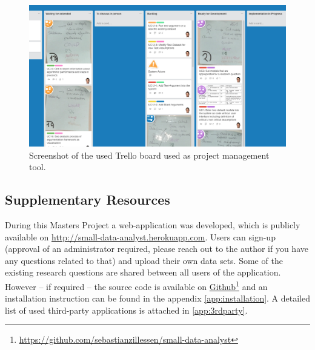 \begin{figure}[h]
\centering
	\includegraphics[page=1,width=\textwidth]{figures/trello}
\caption{Screenshot of the used Trello board used as project management tool.}
\label{fig:trello}
\end{figure}

\subsection{Supplementary Resources}

During this Masters Project a web-application was developed, which is publicly available on \href{http://small-data-analyst.herokuapp.com}{http://small-data-analyst.herokuapp.com}. Users can sign-up (approval of an administrator required, please reach out to the author if you have any questions related to that) and upload their own data sets. Some of the existing research questions are shared between all users of the application. However -- if required -- the source code is available on \href{https://github.com/sebastianzillessen/small-data-analyst}{Github}\footnote{\url{https://github.com/sebastianzillessen/small-data-analyst}} and an installation instruction can be found in the appendix \autoref{app:installation}. A detailed list of used third-party applications is attached in \autoref{app:3rdparty}.

